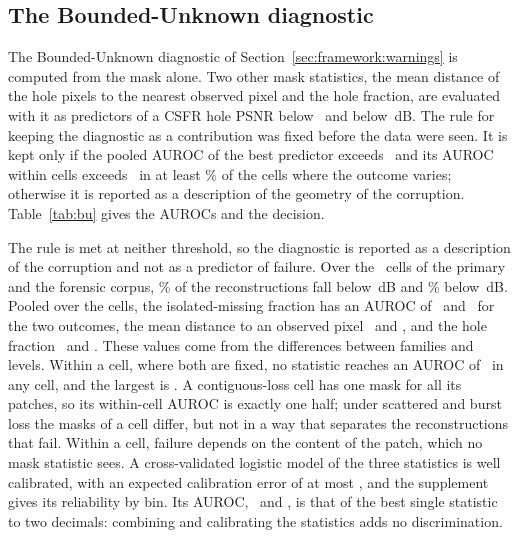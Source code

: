 \documentclass[final,3p]{elsarticle}
\begin{document}
\subsection{The Bounded-Unknown diagnostic}
\label{sec:results:bu}

The Bounded-Unknown diagnostic of Section~\ref{sec:framework:warnings} is computed from the mask alone. Two other mask statistics, the mean distance of the hole pixels to the nearest observed pixel and the hole fraction, are evaluated with it as predictors of a CSFR hole PSNR below \buThreshLow\ and below \buThreshHigh\,dB. The rule for keeping the diagnostic as a contribution was fixed before the data were seen. It is kept only if the pooled AUROC of the best predictor exceeds \buPooledMin\ and its AUROC within cells exceeds \buWithinMin\ in at least \buWithinShare\% of the cells where the outcome varies; otherwise it is reported as a description of the geometry of the corruption. Table~\ref{tab:bu} gives the AUROCs and the decision.

The rule is met at neither threshold, so the diagnostic is reported as a description of the corruption and not as a predictor of failure. Over the \buNCells\ cells of the primary and the forensic corpus, \buFailLow\% of the reconstructions fall below \buThreshLow\,dB and \buFailHigh\% below \buThreshHigh\,dB. Pooled over the cells, the isolated-missing fraction has an AUROC of \buBuPooledLow\ and \buBuPooledHigh\ for the two outcomes, the mean distance to an observed pixel \buDistPooledLow\ and \buDistPooledHigh, and the hole fraction \buFracPooledLow\ and \buFracPooledHigh. These values come from the differences between families and levels. Within a cell, where both are fixed, no statistic reaches an AUROC of \buWithinMin\ in any cell, and the largest is \buWithinMax. A contiguous-loss cell has one mask for all its patches, so its within-cell AUROC is exactly one half; under scattered and burst loss the masks of a cell differ, but not in a way that separates the reconstructions that fail. Within a cell, failure depends on the content of the patch, which no mask statistic sees. A cross-validated logistic model of the three statistics is well calibrated, with an expected calibration error of at most \buEceMax, and the supplement gives its reliability by bin. Its AUROC, \buLogitAurocLow\ and \buLogitAurocHigh, is that of the best single statistic to two decimals: combining and calibrating the statistics adds no discrimination.
\end{document}
